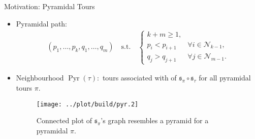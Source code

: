 \documentclass[
  size=10pt,
  style=klope,
  paper=screen,
  pauseslide,
  nopagebreaks,
  fleqn
]{powerdot}
\begin{document}
\begin{slide}{Motivation: Pyramidal Tours}
\begin{itemize}
  \item
  Pyramidal path:
  \begin{align}
  \left( p_1, \ldots, p_k, q_1, \ldots, q_m \right) \quad \text{s.t.} \quad
  \begin{cases}
  k+m \geq 1, & \\
  p_i < p_{i+1} \; & \forall i \in \mathcal{N}_{k-1},\\
  q_j > q_{j+1} \; & \forall j \in \mathcal{N}_{m-1}.
  \end{cases}
  \end{align}
  \item
  Neighbourhood $\operatorname{Pyr}\left(\tau\right):$
  tours associated with of $\mathfrak{s}_\pi \circ \mathfrak{s}_\tau$
  for all pyramidal tours $\pi$.
  \begin{figure}[H]
    \centering
    \texttt{[image: ../plot/build/pyr.2]}
    \caption{%
      Connected plot of $\mathfrak{s}_\pi$'s graph resembles a pyramid
      for a pyramidal $\pi$.
    }
  \end{figure}
\end{itemize}
\end{slide}
\end{document}
